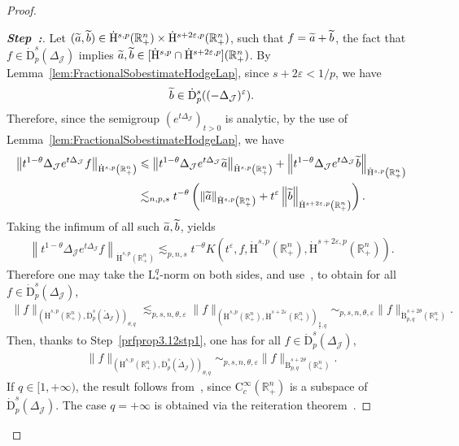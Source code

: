 \documentclass[AHL,Unicode,longabstracts,published]{cedram}
\newcommand{\bbR}{\mathbb{R}}
\newcommand{\rmH}{\mathrm{H}}%
\newcommand{\rmB}{\mathrm{B}}
\newcommand{\rmD}{\mathrm{D}}
\newcommand{\rmL}{\mathrm{L}}
\newcommand{\rmC}{\mathrm{C}}
\newcommand{\clJ}{\mathcal{J}}
\newcounter{stepcount}
\newenvironment{step}{\refstepcounter{stepcount}\begin{proof}[\textbf{Step~\thestepcount:}]}{\let\qed\relax\end{proof}}
\let\oldtilde\tilde
\renewcommand*{\tilde}[1]{\mathchoice{\widetilde{#1}}{\widetilde{#1}}{\oldtilde{#1}}{\oldtilde{#1}}}
\begin{document}
\begin{proof}
\begin{step}
Let $(\tilde{a},\tilde{b})\in\dot{\rmH}^{s,p}(\bbR^n_+)\times\dot{\rmH}^{s+2\varepsilon,p}(\bbR^n_+)$, such that $f=\tilde{a}+\tilde{b}$, the fact that $f\in \dot{\rmD}^{s}_{p}({{\Delta}}_{\clJ})$ implies $\tilde{a},\tilde{b}\in [\dot{\rmH}^{s,p}\cap\dot{\rmH}^{s+2\varepsilon,p}](\bbR^n_+)$. By Lemma~\ref{lem:FractionalSobestimateHodgeLap}, since $s+2\varepsilon<1/p$, we have
\begin{align*}
\tilde{b} \in \dot{\rmD}^{s}_{p}((-{{\Delta}}_{\clJ})^\varepsilon).
\end{align*}
Therefore, since the semigroup $(e^{t\Delta_\clJ})_{t>0}$ is analytic, by the use of Lemma~\ref{lem:FractionalSobestimateHodgeLap}, we have
\begin{align*}
\left\| t^{1-\theta} \Delta_{\clJ}e^{t\Delta_{\clJ}} f\right \|_{\dot{\rmH}^{s,p}\left(\bbR^n_+\right)} &\leqslant \left \| t^{1-\theta} \Delta_{\clJ}e^{t\Delta_{\clJ}} \tilde{a}\right \|_{\dot{\rmH}^{s,p}\left(\bbR^n_+\right)} + \left \| t^{1-\theta} \Delta_{\clJ}e^{t\Delta_{\clJ}} \tilde{b}\right \|_{\dot{\rmH}^{s,p}\left(\bbR^n_+\right)}\\
&\lesssim_{n,p,s} t^{-\theta} \left(\left \| \tilde{a}\right\|_{\dot{\rmH}^{s,p}\left(\bbR^n_+\right)} + t^{\varepsilon} \left\| \tilde{b}\right\|_{\dot{\rmH}^{s+2\varepsilon,p}\left(\bbR^n_+\right)}\right).
\end{align*}
Taking the infimum of all such $\tilde{a},\tilde{b}$, yields
\begin{align*}
\left \| t^{1-\theta} \Delta_{\clJ}e^{t\Delta_{\clJ}} f\right\|_{\dot{\rmH}^{s,p}\left(\bbR^n_+\right)} \lesssim_{p,n,s} t^{-\theta}K\left (t^{\varepsilon},f,\dot{\rmH}^{s,p}\left(\bbR^n_+\right),\dot{\rmH}^{s+2\varepsilon,p}\left(\bbR^n_+\right)\right).
\end{align*}
Therefore one may take the $\rmL^q_{\ast}$-norm on both sides, and use~\cite[Proposition~3.17]{Gaudin2022}, to obtain for all $f\in \dot{\rmD}^{s}_{p}({{\Delta}}_{\clJ})$,
\begin{align*}
\| f \|_{\left(\dot{\rmH}^{s,p}\left(\bbR^n_+\right),\dot{\rmD}^{s}_{p}\left(\mathring{\Delta}_\clJ\right)\right)_{\theta,q}}\lesssim_{p,s,n,\theta,\varepsilon} \| f \|_{\left(\dot{\rmH}^{s,p}\left(\bbR^n_+\right),\dot{\rmH}^{s+2\varepsilon}\left(\bbR^n_+\right)\right)_{\frac{\theta}{\varepsilon},q}} \sim_{p,s,n,\theta,\varepsilon} \| f \|_{\dot{\rmB}^{s+2\theta}_{p,q}\left(\bbR^n_+\right)}.
\end{align*}
Then, thanks to Step~\ref{prfprop3.12stp1}, one has for all $f\in \dot{\rmD}^{s}_{p}({{\Delta}}_{\clJ})$,
\begin{align*}
\| f \|_{\left(\dot{\rmH}^{s,p}\left(\bbR^n_+\right),\dot{\rmD}^{s}_{p}(\mathring{\Delta}_\clJ)\right)_{\theta,q}}\sim_{p,s,n,\theta,\varepsilon} \| f \|_{\dot{\rmB}^{s+2\theta}_{p,q}\left(\bbR^n_+\right)}.
\end{align*}
If $q\in[1,+\infty)$, the result follows from~\cite[Corollary~3.18]{Gaudin2022}, since $\rmC _c^\infty(\bbR^n_+)$ is a subspace of $\dot{\rmD}^{s}_{p}({{\Delta}}_{\clJ})$. The case $q=+\infty$ is obtained via the reiteration theorem~\cite[Theorem~3.5.3]{BerghLofstrom1976}.
\end{step}


\end{proof}
\end{document}
